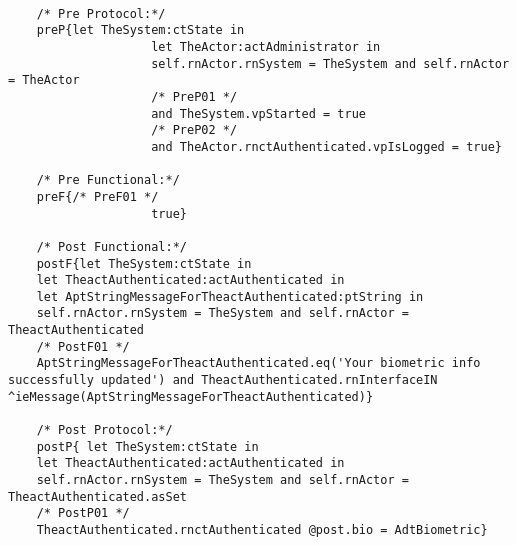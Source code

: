 	\scriptsize
	\vspace{0.5cm}
	\begin{lstlisting}[style=MessirStyle,firstnumber=auto,captionpos=b,caption={\msrmessir (MCL-oriented) specification of the operation \emph{oeUpdateBio}.},label=OM-actAuthenticated-oeUpdateBio-MCL-LST]

	/* Pre Protocol:*/ 
	preP{let TheSystem:ctState in
					let TheActor:actAdministrator in
					self.rnActor.rnSystem = TheSystem and self.rnActor = TheActor
					/* PreP01 */
					and TheSystem.vpStarted = true
					/* PreP02 */
					and TheActor.rnctAuthenticated.vpIsLogged = true}
	
	/* Pre Functional:*/
	preF{/* PreF01 */
					true}
	
	/* Post Functional:*/ 
	postF{let TheSystem:ctState in
	let TheactAuthenticated:actAuthenticated in
	let AptStringMessageForTheactAuthenticated:ptString in
	self.rnActor.rnSystem = TheSystem and self.rnActor = TheactAuthenticated
	/* PostF01 */
	AptStringMessageForTheactAuthenticated.eq('Your biometric info successfully updated') and TheactAuthenticated.rnInterfaceIN ^ieMessage(AptStringMessageForTheactAuthenticated)}
	
	/* Post Protocol:*/ 
	postP{ let TheSystem:ctState in
	let TheactAuthenticated:actAuthenticated in
	self.rnActor.rnSystem = TheSystem and self.rnActor = TheactAuthenticated.asSet
	/* PostP01 */
	TheactAuthenticated.rnctAuthenticated @post.bio = AdtBiometric}
	
	\end{lstlisting}
	\normalsize 
	
	
	
	





